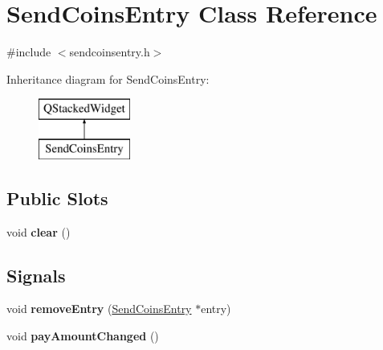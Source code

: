 \hypertarget{class_send_coins_entry}{}\section{Send\+Coins\+Entry Class Reference}
\label{class_send_coins_entry}


{\ttfamily \#include $<$sendcoinsentry.\+h$>$}

Inheritance diagram for Send\+Coins\+Entry\+:\begin{figure}[H]
\begin{center}
\leavevmode
\includegraphics[height=2.000000cm]{class_send_coins_entry}
\end{center}
\end{figure}
\subsection*{Public Slots}
\begin{DoxyCompactItemize}
\item 
\mbox{\label{class_send_coins_entry_abff66fcd456c82144e7a2c410f5082ac}} 
void {\bfseries clear} ()
\end{DoxyCompactItemize}
\subsection*{Signals}
\begin{DoxyCompactItemize}
\item 
\mbox{\label{class_send_coins_entry_a9105a4f91781f96b91a1da65da9032bf}} 
void {\bfseries remove\+Entry} (\mbox{\hyperlink{class_send_coins_entry}{Send\+Coins\+Entry}} $\ast$entry)
\item 
\mbox{\label{class_send_coins_entry_a9f4fec53927c3ddd37ccea53f8d1e370}} 
void {\bfseries pay\+Amount\+Changed} ()
\end{DoxyCompactItemize}
